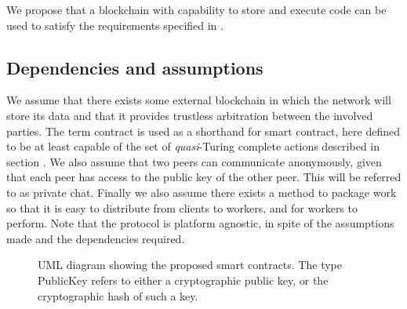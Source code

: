 We propose that a blockchain with capability to store and execute code can be used to satisfy the requirements specified in .

\subsection{Dependencies and assumptions}
\label{sec:res:dependencies}
We assume that there exists some external blockchain in which the network will store its data and that it provides trustless arbitration between the involved parties. The term contract is used as a shorthand for smart contract, here defined to be at least capable of the set of \textit{quasi}-Turing complete actions described in section . We also assume that two peers can communicate anonymously, given that each peer has access to the public key of the other peer. This will be referred to as private chat. Finally we also assume there exists a method to package work so that it is easy to distribute from clients to workers, and for workers to perform.
Note that the protocol is platform agnostic, in spite of the assumptions made and the dependencies required.

\begin{figure}[ht]
\centering
{}
\caption{UML diagram showing the proposed smart contracts. The type PublicKey refers to either a cryptographic public key, or the cryptographic hash of such a key.}
\label{fig:res:umal}
\end{figure}

